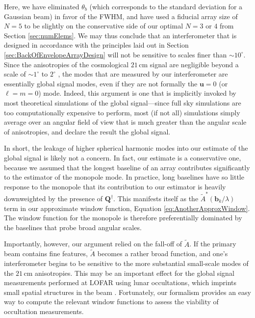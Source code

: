 \documentclass[twocolumn,apj,numberedappendix]{emulateapj}
\newcommand{\acl}[1]{{\color{red} \textbf{[ACL:  #1]}}}
\begin{document}
Here, we have eliminated $\theta_b$ (which corresponds to the standard deviation for a Gaussian beam) in favor of the FWHM, and have used a fiducial array size of $N=5$ to be slightly on the conservative side of our optimal $N=3$ or $4$ from Section \ref{sec:numElems}. We may thus conclude that an interferometer that is designed in accordance with the principles laid out in Section \ref{sec:BackOfEnvelopeArrayDesign} will not be sensitive to scales finer than $\sim 10^\circ$. Since the anisotropies of the cosmological $21\,\textrm{cm}$ signal are negligible beyond a scale of $\sim 1^\circ$ to $2^\circ$ \citep{BittnerLoeb2011}, the modes that are measured by our interferometer are essentially global signal modes, even if they are not formally the $\mathbf{u} = 0$ (or $\ell = m = 0$) mode. Indeed, this argument is one that is implicitly invoked by most theoretical simulations of the global signal---since full sky simulations are too computationally expensive to perform, most (if not all) simulations simply average over an angular field of view that is much greater than the angular scale of anisotropies, and declare the result the global signal.

In short, the leakage of higher spherical harmonic modes into our estimate of the global signal is likely not a concern. In fact, our estimate is a conservative one, because we assumed that the longest baseline of an array contributes significantly to the estimator of the monopole mode. In practice, long baselines have so little response to the monopole that its contribution to our estimator is heavily downweighted by the presence of $\mathbf{Q}^\dagger$. This manifests itself as the $\widetilde{A}^* ( \mathbf{b}_k / \lambda )$ term in our approximate window function, Equation \eqref{eq:AnotherApproxWindow}. The window function for the monopole is therefore preferentially dominated by the baselines that probe broad angular scales.

Importantly, however, our argument relied on the fall-off of $\widetilde{A}$. If the primary beam contains fine features, $\widetilde{A}$ becomes a rather broad function, and one's interferometer begins to be sensitive to the more substantial small-scale modes of the $21\,\textrm{cm}$ anisotropies. This may be an important effect for the global signal measurements performed at LOFAR using lunar occultations, which imprints small spatial structures in the beam \citep{VedanthamLOFAR2}. Fortunately, our formalism provides an easy way to compute the relevant window functions to assess the viability of occultation measurements.
\end{document}
